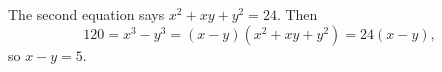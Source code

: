 The second equation says $x^2+xy+y^2=24$. Then
\[
120=x^3-y^3=(x-y)(x^2+xy+y^2)=24(x-y),
\]
so $x-y=\boxed{5}$.
